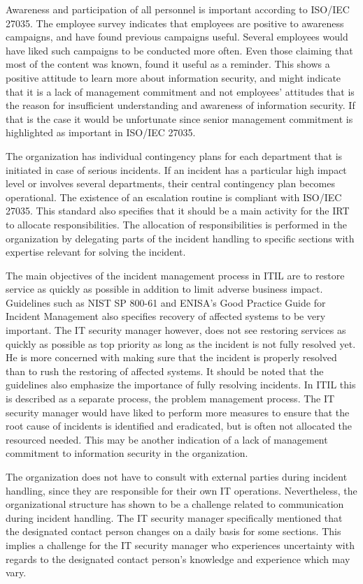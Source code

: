 Awareness and participation of all personnel is important according to ISO/IEC 27035. The employee survey indicates that employees are positive to awareness campaigns, and have found previous campaigns useful. Several employees would have liked such campaigns to be conducted more often. Even those claiming that most of the content was known, found it useful as a reminder. This shows a positive attitude to learn more about information security, and might indicate that it is a lack of management commitment and not employees' attitudes that is the reason for insufficient understanding and awareness of information security. If that is the case it would be unfortunate since senior management commitment is highlighted as important in ISO/IEC 27035.

The organization has individual contingency plans for each department that is initiated in case of serious incidents. If an incident has a particular high impact level or involves several departments, their central contingency plan becomes operational. The existence of an escalation routine is compliant with ISO/IEC 27035. This standard also specifies that it should be a main activity for the \ac{IRT} to allocate responsibilities. The allocation of responsibilities is performed in the organization by delegating parts of the incident handling to specific sections with expertise relevant for solving the incident.

The main objectives of the incident management process in ITIL are to restore service as quickly as possible in addition to limit adverse business impact. Guidelines such as NIST SP 800-61 and ENISA's Good Practice Guide for Incident Management also specifies recovery of affected systems to be very important.  The IT security manager however, does not see restoring services as quickly as possible as top priority as long as the incident is not fully resolved yet. He is more concerned with making sure that the incident is properly resolved than to rush the restoring of affected systems. It should be noted that the guidelines also emphasize the importance of fully resolving incidents. In ITIL this is described as a separate process, the problem management process. The IT security manager would have liked to perform more measures to ensure that the root cause of incidents is identified and eradicated, but is often not allocated the resourced needed. This may be another indication of a lack of management commitment to information security in the organization.

The organization does not have to consult with external parties during incident handling, since they are responsible for their own IT operations. Nevertheless, the organizational structure has shown to be a challenge related to communication during incident handling. The IT security manager specifically mentioned that the designated contact person changes on a daily basis for some sections. This implies a challenge for the IT security manager who experiences uncertainty with regards to the designated contact person's knowledge and experience which may vary.

